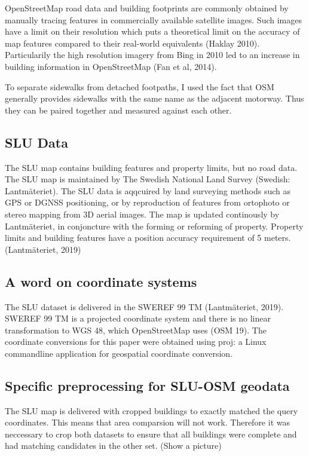 \documentclass[a4paper]{article}
\begin{document}
OpenStreetMap road data and building footprints are commonly obtained by manually tracing features in commercially available satellite images. Such images have a limit on their resolution which puts a theoretical limit on the accuracy of map features compared to their real-world equivalents (Haklay 2010). Particularily the high resolution imagery from Bing in 2010 led to an increase in building information in OpenStreetMap (Fan et al, 2014).

To separate sidewalks from detached footpaths, I used the fact that OSM generally provides sidewalks with the same name as the adjacent motorway. Thus they can be paired together and measured against each other.

\subsection{SLU Data}

The SLU map contains building features and property limits, but no road data.
The SLU map is maintained by The Swedish National Land Survey (Swedish: Lantmäteriet).
The SLU data is aqqcuired by land surveying methods such as GPS or DGNSS positioning, or by reproduction of features from ortophoto or stereo mapping from 3D aerial images.
The map is updated continously by Lantmäteriet, in conjoncture with the forming or reforming of property.
Property limits and building features have a position accuracy requirement of 5 meters.
(Lantmäteriet, 2019)

\subsection{A word on coordinate systems}

The SLU dataset is delivered in the SWEREF 99 TM (Lantmäteriet, 2019). SWEREF 99 TM is a projected coordinate system and there is no linear transformation to WGS 48, which OpenStreetMap uses (OSM 19). The coordinate conversions for this paper were obtained using proj: a Linux commandline application for geospatial coordinate conversion.

\subsection{Specific preprocessing for SLU-OSM geodata}

The SLU map is delivered with cropped buildings to exactly matched the query coordinates. This means that area comparsion will not work.
Therefore it was neccessary to crop both datasets to ensure that all buildings were complete and had matching candidates in the other set.
(Show a picture)
\end{document}
